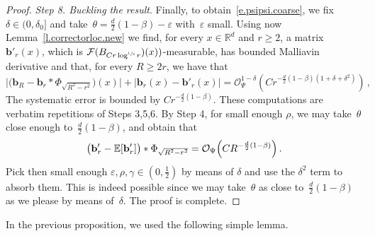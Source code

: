 \documentclass[11pt]{article} %
\numberwithin{equation}{section}
\theoremstyle{definition}
\newcommand*{\R}{\ensuremath{\mathbb{R}}}
\newcommand{\eps}{\varepsilon}
\renewcommand{\b}{\ensuremath{\mathbf{b}}}
\newcommand{\ep}{\eps}
\newcommand{\F}{\mathcal{F}}
\newcommand{\E}{\mathbb{E}}
\renewcommand{\O}{\mathcal{O}}
\begin{document}
\begin{proof}
\smallskip 

\emph{Step 8. Buckling the result}. 
Finally, to obtain~\eqref{e.psipsi.coarse}, we fix~$\delta \in (0,\delta_0]$ and take~$\theta = \frac d2(1-\beta)-\ep$ with~$\ep$ small. Using now Lemma~\ref{l.correctorloc.new} we find, for every $x \in \R^d$ and $r \geq 2$, a matrix $ \b'_{r}(x)$, which is $\F(B_{C r \log^{\sfrac12} r})(x))$-measurable, has bounded Malliavin derivative and that, for every $R \geq 2r$, we have that 
\begin{equation}  \label{e.add.local}
\big|
\bigl( \b_R - \b_r \ast \Phi_{\sqrt{R^2-r^2}} \bigr) (x) 
\big|
+
\big| 
\b_r(x)  - \b'_{r}(x)
\big|   
= 
\O_\Psi^{1-\delta}(C r^{-\frac d2 (1-\beta)(1+\delta+\delta^2)})
\,,
\end{equation}
The systematic error is bounded by $Cr^{-\frac d2 (1-\beta)}$. These computations are verbatim repetitions of Steps 3,5,6. By Step 4,  for small enough $\rho$, we may take~$\theta$ close enough to~$\frac d2 (1-\beta)$, and obtain that
\begin{equation}  \label{e.br.flucs.again}
\bigl( \b'_{r} - \E [ \b'_{r} ] \bigr) \ast \Phi_{\sqrt{R^2-r^2}} 
= 
 \O_{\Psi} \Bigl( C R^{-\frac d2(1-\beta) } \Bigr) 
\,.
\end{equation}
Pick then small enough $\ep,\rho,\gamma \in (0,\frac12)$ by means of $\delta$ and use the $\delta^2$ term to absorb them. This is indeed possible since we may take~$\theta$ as close to~$\frac d2 (1-\beta)$ as we please by means of~$\delta$. The proof is complete. 
\end{proof}


In the previous proposition, we used the following simple lemma. 
\end{document}
